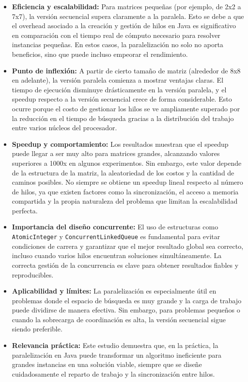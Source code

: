 \documentclass[12pt]{article}
\begin{document}
\begin{itemize}
    \item \textbf{Eficiencia y escalabilidad:} Para matrices pequeñas (por ejemplo, de 2x2 a 7x7), la versión secuencial supera claramente a la paralela. Esto se debe a que el overhead asociado a la creación y gestión de hilos en Java es significativo en comparación con el tiempo real de cómputo necesario para resolver instancias pequeñas. En estos casos, la paralelización no solo no aporta beneficios, sino que puede incluso empeorar el rendimiento.
    \item \textbf{Punto de inflexión:} A partir de cierto tamaño de matriz (alrededor de 8x8 en adelante), la versión paralela comienza a mostrar ventajas claras. El tiempo de ejecución disminuye drásticamente en la versión paralela, y el speedup respecto a la versión secuencial crece de forma considerable. Esto ocurre porque el costo de gestionar los hilos se ve ampliamente superado por la reducción en el tiempo de búsqueda gracias a la distribución del trabajo entre varios núcleos del procesador.
    \item \textbf{Speedup y comportamiento:} Los resultados muestran que el speedup puede llegar a ser muy alto para matrices grandes, alcanzando valores superiores a 1000x en algunos experimentos. Sin embargo, este valor depende de la estructura de la matriz, la aleatoriedad de los costos y la cantidad de caminos posibles. No siempre se obtiene un speedup lineal respecto al número de hilos, ya que existen factores como la sincronización, el acceso a memoria compartida y la propia naturaleza del problema que limitan la escalabilidad perfecta.
    \item \textbf{Importancia del diseño concurrente:} El uso de estructuras como \texttt{AtomicInteger} y \texttt{ConcurrentLinkedQueue} es fundamental para evitar condiciones de carrera y garantizar que el mejor resultado global sea correcto, incluso cuando varios hilos encuentran soluciones simultáneamente. La correcta gestión de la concurrencia es clave para obtener resultados fiables y reproducibles.
    \item \textbf{Aplicabilidad y límites:} La paralelización es especialmente útil en problemas donde el espacio de búsqueda es muy grande y la carga de trabajo puede dividirse de manera efectiva. Sin embargo, para problemas pequeños o cuando la sobrecarga de coordinación es alta, la versión secuencial sigue siendo preferible.
    \item \textbf{Relevancia práctica:} Este estudio demuestra que, en la práctica, la paralelización en Java puede transformar un algoritmo ineficiente para grandes instancias en una solución viable, siempre que se diseñe cuidadosamente el reparto de trabajo y la sincronización entre hilos.
\end{itemize}
\end{document}
